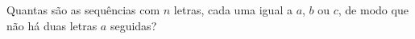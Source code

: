 \item Quantas são as sequências com $n$ letras, cada uma igual a $a$, $b$ ou $c$, de modo que não há
  duas   letras $a$  seguidas?

